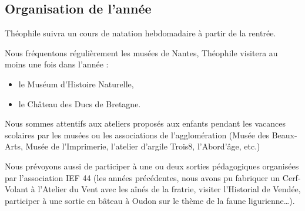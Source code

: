 \documentclass[french]{article}
\begin{document}
\subsection{Organisation de l'année}

Théophile suivra un cours de natation hebdomadaire à partir de la rentrée.

Nous fréquentons régulièrement les musées de Nantes, Théophile visitera au moins une fois dans l'année :
\begin{itemize}
	\item le Muséum d'Histoire Naturelle,
	\item le Château des Ducs de Bretagne.
\end{itemize}

Nous sommes attentifs aux ateliers proposés aux enfants pendant les vacances scolaires par les musées ou les associations de l'agglomération (Musée des Beaux-Arts, Musée de l'Imprimerie, l'atelier d'argile Trois8, l'Abord'âge, etc.)

Nous prévoyons aussi de participer à une ou deux sorties pédagogiques organisées par l'association IEF 44 (les années précédentes, nous avons pu fabriquer un Cerf-Volant à l'Atelier du Vent avec les aînés de la fratrie, visiter l'Historial de Vendée, participer à une sortie en bâteau à Oudon sur le thème de la faune ligurienne\ldots{}).
\end{document}
